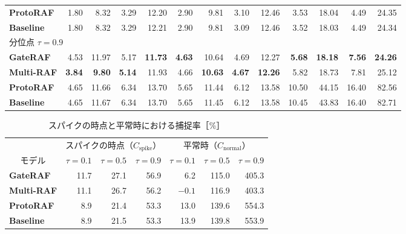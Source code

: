 \documentclass[twocolumn, lastpage]{jarticle}
\newif\ifrevmark
\newcommand{\revAcolor}{\ifrevmark\color{blue}\fi}
\begin{document}
\begin{table}[t]
\begin{tabular}{lrrrrrrrrrrrr}
        \quad \textbf{ProtoRAF} & 1.80 & 8.32 & 3.29 & 12.20 & 2.90 & 9.81 & 3.10 & 12.46 & 3.53 & 18.04 & 4.49 & 24.35 \\
        \quad \textbf{Baseline} & 1.80 & 8.32 & 3.29 & 12.21 & 2.90 & 9.81 & 3.09 & 12.46 & 3.52 & 18.03 & 4.49 & 24.34 \\
        \hline
        \multicolumn{13}{l}{分位点 $\tau=0.9$} \\
        \quad \textbf{GateRAF} & 4.53 & 11.97 & 5.17 & \textbf{11.73} & \textbf{4.63} & 10.64 & 4.69 & 12.27 & \textbf{5.68} & \textbf{18.18} & \textbf{7.56} & \textbf{24.26} \\
        \quad \textbf{Multi-RAF} & \textbf{3.84} & \textbf{9.80} & \textbf{5.14} & 11.93 & 4.66 & \textbf{10.63} & \textbf{4.67} & \textbf{12.26} & 5.82 & 18.73 & 7.81 & 25.12 \\
        \quad \textbf{ProtoRAF} & 4.65 & 11.66 & 6.34 & 13.70 & 5.65 & 11.44 & 6.12 & 13.58 & 10.50 & 44.15 & 16.40 & 82.56 \\
        \quad \textbf{Baseline} & 4.65 & 11.67 & 6.34 & 13.70 & 5.65 & 11.45 & 6.12 & 13.58 & 10.45 & 43.83 & 16.40 & 82.71 \\
        \hline
    \end{tabular}
\end{table}

\begin{table}[t]
    \revAcolor
    \caption{スパイクの時点と平常時における捕捉率［\%］}
    \label{tab:capture}
    \centering
    \setlength{\tabcolsep}{8pt}%
    \begin{tabular}{lrrrrrr}
        \hline
        & \multicolumn{3}{c}{スパイクの時点（$C_{\mathrm{spike}}$）} & \multicolumn{3}{c}{平常時（$C_{\mathrm{normal}}$）} \\
        \cline{2-4} \cline{5-7}
        \multicolumn{1}{c}{モデル} & $\tau=0.1$ & $\tau=0.5$ & $\tau=0.9$ & $\tau=0.1$ & $\tau=0.5$ & $\tau=0.9$ \\
        \hline
        \textbf{GateRAF} & 11.7 & 27.1 & 56.9 & 6.2 & 115.0 & 405.3 \\
        \textbf{Multi-RAF} & 11.1 & 26.7 & 56.2 & $-0.1$ & 116.9 & 403.3 \\
        \textbf{ProtoRAF} & 8.9 & 21.4 & 53.3 & 13.0 & 139.6 & 554.3 \\
        \textbf{Baseline} & 8.9 & 21.5 & 53.3 & 13.9 & 139.8 & 553.9 \\
        \hline
    \end{tabular}
\end{table}
\end{document}
